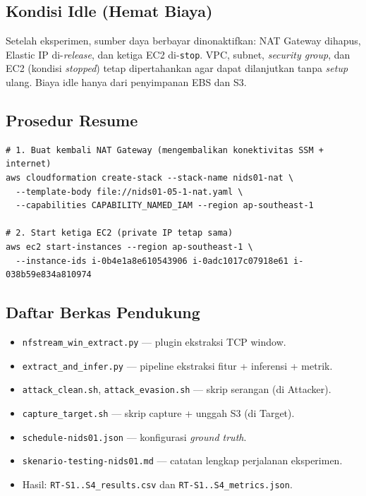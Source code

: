 \documentclass[11pt, a4paper]{article}
\begin{document}
\subsection{Kondisi Idle (Hemat Biaya)}
Setelah eksperimen, sumber daya berbayar dinonaktifkan: NAT Gateway dihapus, Elastic IP di-\textit{release}, dan ketiga EC2 di-\texttt{stop}. VPC, subnet, \textit{security group}, dan EC2 (kondisi \textit{stopped}) tetap dipertahankan agar dapat dilanjutkan tanpa \textit{setup} ulang. Biaya idle hanya dari penyimpanan EBS dan S3.

\subsection{Prosedur Resume}
\begin{lstlisting}[style=bash, caption={Melanjutkan eksperimen}]
# 1. Buat kembali NAT Gateway (mengembalikan konektivitas SSM + internet)
aws cloudformation create-stack --stack-name nids01-nat \
  --template-body file://nids01-05-1-nat.yaml \
  --capabilities CAPABILITY_NAMED_IAM --region ap-southeast-1

# 2. Start ketiga EC2 (private IP tetap sama)
aws ec2 start-instances --region ap-southeast-1 \
  --instance-ids i-0b4e1a8e610543906 i-0adc1017c07918e61 i-038b59e834a810974
\end{lstlisting}

\subsection{Daftar Berkas Pendukung}
\begin{itemize}[leftmargin=1.4cm]
    \item \texttt{nfstream\_win\_extract.py} --- plugin ekstraksi TCP window.
    \item \texttt{extract\_and\_infer.py} --- pipeline ekstraksi fitur + inferensi + metrik.
    \item \texttt{attack\_clean.sh}, \texttt{attack\_evasion.sh} --- skrip serangan (di Attacker).
    \item \texttt{capture\_target.sh} --- skrip capture + unggah S3 (di Target).
    \item \texttt{schedule-nids01.json} --- konfigurasi \textit{ground truth}.
    \item \texttt{skenario-testing-nids01.md} --- catatan lengkap perjalanan eksperimen.
    \item Hasil: \texttt{RT-S1..S4\_results.csv} dan \texttt{RT-S1..S4\_metrics.json}.
\end{itemize}
\end{document}

